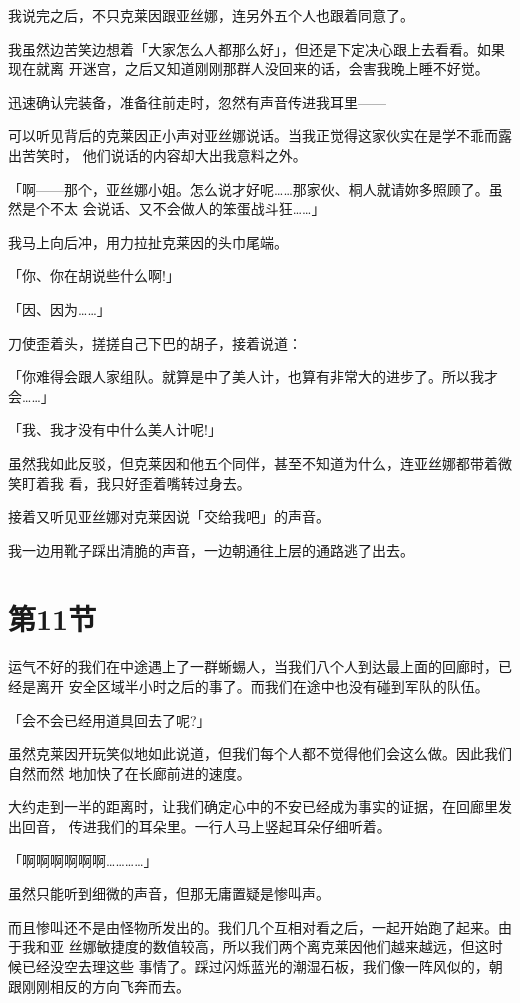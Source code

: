 \documentclass[11pt]{book}
\begin{document}
我说完之后，不只克莱因跟亚丝娜，连另外五个人也跟着同意了。

我虽然边苦笑边想着「大家怎么人都那么好」，但还是下定决心跟上去看看。如果现在就离
开迷宫，之后又知道刚刚那群人没回来的话，会害我晚上睡不好觉。

迅速确认完装备，准备往前走时，忽然有声音传进我耳里——

可以听见背后的克莱因正小声对亚丝娜说话。当我正觉得这家伙实在是学不乖而露出苦笑时，
他们说话的内容却大出我意料之外。

「啊——那个，亚丝娜小姐。怎么说才好呢……那家伙、桐人就请妳多照顾了。虽然是个不太
会说话、又不会做人的笨蛋战斗狂……」

我马上向后冲，用力拉扯克莱因的头巾尾端。

「你、你在胡说些什么啊!」

「因、因为……」

刀使歪着头，搓搓自己下巴的胡子，接着说道：

「你难得会跟人家组队。就算是中了美人计，也算有非常大的进步了。所以我才会……」

「我、我才没有中什么美人计呢!」

虽然我如此反驳，但克莱因和他五个同伴，甚至不知道为什么，连亚丝娜都带着微笑盯着我
看，我只好歪着嘴转过身去。

接着又听见亚丝娜对克莱因说「交给我吧」的声音。

我一边用靴子踩出清脆的声音，一边朝通往上层的通路逃了出去。
\section{第11节}
\label{sec:org0a76eff}
运气不好的我们在中途遇上了一群蜥蜴人，当我们八个人到达最上面的回廊时，已经是离开
安全区域半小时之后的事了。而我们在途中也没有碰到军队的队伍。

「会不会已经用道具回去了呢?」

虽然克莱因开玩笑似地如此说道，但我们每个人都不觉得他们会这么做。因此我们自然而然
地加快了在长廊前进的速度。

大约走到一半的距离时，让我们确定心中的不安已经成为事实的证据，在回廊里发出回音，
传进我们的耳朵里。一行人马上竖起耳朵仔细听着。

「啊啊啊啊啊啊…………」

虽然只能听到细微的声音，但那无庸置疑是惨叫声。

而且惨叫还不是由怪物所发出的。我们几个互相对看之后，一起开始跑了起来。由于我和亚
丝娜敏捷度的数值较高，所以我们两个离克莱因他们越来越远，但这时候已经没空去理这些
事情了。踩过闪烁蓝光的潮湿石板，我们像一阵风似的，朝跟刚刚相反的方向飞奔而去。
\end{document}
